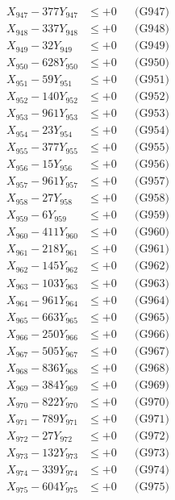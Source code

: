 \documentclass[a4paper,10pt]{article}
\begin{document}
{\begin{align}
X_{947} - 377Y_{947} &\leq +0 && \text{(G947)} \\
X_{948} - 337Y_{948} &\leq +0 && \text{(G948)} \\
X_{949} - 32Y_{949} &\leq +0 && \text{(G949)} \\
X_{950} - 628Y_{950} &\leq +0 && \text{(G950)} \\
\allowbreak
X_{951} - 59Y_{951} &\leq +0 && \text{(G951)} \\
X_{952} - 140Y_{952} &\leq +0 && \text{(G952)} \\
X_{953} - 961Y_{953} &\leq +0 && \text{(G953)} \\
X_{954} - 23Y_{954} &\leq +0 && \text{(G954)} \\
X_{955} - 377Y_{955} &\leq +0 && \text{(G955)} \\
X_{956} - 15Y_{956} &\leq +0 && \text{(G956)} \\
X_{957} - 961Y_{957} &\leq +0 && \text{(G957)} \\
X_{958} - 27Y_{958} &\leq +0 && \text{(G958)} \\
X_{959} - 6Y_{959} &\leq +0 && \text{(G959)} \\
X_{960} - 411Y_{960} &\leq +0 && \text{(G960)} \\
\allowbreak
X_{961} - 218Y_{961} &\leq +0 && \text{(G961)} \\
X_{962} - 145Y_{962} &\leq +0 && \text{(G962)} \\
X_{963} - 103Y_{963} &\leq +0 && \text{(G963)} \\
X_{964} - 961Y_{964} &\leq +0 && \text{(G964)} \\
X_{965} - 663Y_{965} &\leq +0 && \text{(G965)} \\
X_{966} - 250Y_{966} &\leq +0 && \text{(G966)} \\
X_{967} - 505Y_{967} &\leq +0 && \text{(G967)} \\
X_{968} - 836Y_{968} &\leq +0 && \text{(G968)} \\
X_{969} - 384Y_{969} &\leq +0 && \text{(G969)} \\
X_{970} - 822Y_{970} &\leq +0 && \text{(G970)} \\
\allowbreak
X_{971} - 789Y_{971} &\leq +0 && \text{(G971)} \\
X_{972} - 27Y_{972} &\leq +0 && \text{(G972)} \\
X_{973} - 132Y_{973} &\leq +0 && \text{(G973)} \\
X_{974} - 339Y_{974} &\leq +0 && \text{(G974)} \\
X_{975} - 604Y_{975} &\leq +0 && \text{(G975)} \\

\end{align}}
\end{document}
